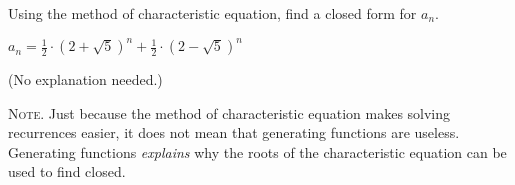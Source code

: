\nextq
Using the method of characteristic equation, find a closed form for $a_n$.
\\
\ANSWER
\begin{answerlong}
    $a_n = \frac{1}{2} \cdot (2+\sqrt{5})^n + \frac{1}{2} \cdot (2-\sqrt{5})^n$
\end{answerlong}
(No explanation needed.)

\textsc{Note.}
Just because the method of characteristic equation makes solving recurrences
easier, it does not mean that generating functions are useless.
Generating functions \textit{explains} why the roots of the characteristic
equation can be used to find closed.

\newpage


